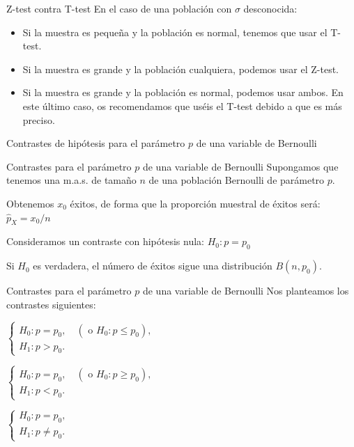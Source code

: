 \documentclass[
  ignorenonframetext,
]{beamer}
\begin{document}
\begin{frame}{Z-test contra T-test}
\protect\hypertarget{z-test-contra-t-test}{}
En el caso de una población con \(\sigma\) desconocida:

\begin{itemize}[<+->]
\item
  Si la muestra es pequeña y la población es normal, tenemos que usar el
  T-test.
\item
  Si la muestra es grande y la población cualquiera, podemos usar el
  Z-test.
\item
  Si la muestra es grande y la población es normal, podemos usar ambos.
  En este último caso, os recomendamos que uséis el T-test debido a que
  es más preciso.
\end{itemize}
\end{frame}

\begin{frame}{Contrastes de hipótesis para el parámetro \(p\) de una
variable de Bernoulli}
\protect\hypertarget{contrastes-de-hipuxf3tesis-para-el-paruxe1metro-p-de-una-variable-de-bernoulli}{}
\end{frame}

\begin{frame}{Contrastes para el parámetro \(p\) de una variable de
Bernoulli}
\protect\hypertarget{contrastes-para-el-paruxe1metro-p-de-una-variable-de-bernoulli}{}
Supongamos que tenemos una m.a.s. de tamaño \(n\) de una población
Bernoulli de parámetro \(p\).

Obtenemos \(x_0\) éxitos, de forma que la proporción muestral de éxitos
será: \(\widehat{p}_X=x_0/n\)

Consideramos un contraste con hipótesis nula: \(H_0: p=p_0\)

Si \(H_0\) es verdadera, el número de éxitos sigue una distribución
\(B(n,p_0)\).
\end{frame}

\begin{frame}{Contrastes para el parámetro \(p\) de una variable de
Bernoulli}
\protect\hypertarget{contrastes-para-el-paruxe1metro-p-de-una-variable-de-bernoulli-1}{}
Nos planteamos los contrastes siguientes:

\(\left\{\begin{array}{l} H_0:p=p_0, \quad (\mbox{ o } H_0:p\leq p_0),\\ H_1:p>p_0. \end{array} \right.\)

\(\left\{\begin{array}{l} H_0:p=p_0, \quad (\mbox{ o } H_0:p\geq p_0),\\ H_1:p<p_0. \end{array} \right.\)

\(\left\{\begin{array}{l} H_0:p=p_0, \\ H_1:p\neq p_0. \end{array} \right.\)
\end{frame}
\end{document}
